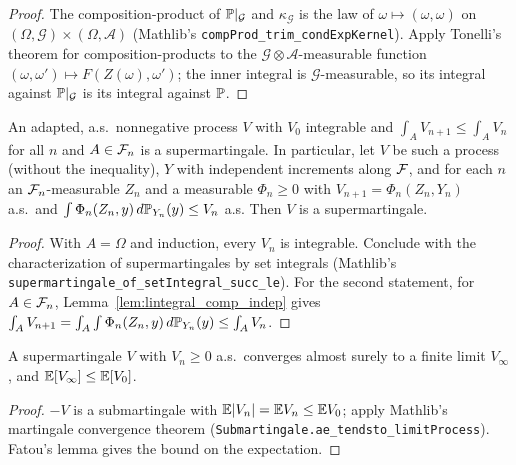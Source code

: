 \begin{proof}
  \leanok
  The composition-product of $\mathbb{P}|_{\mathcal G}$ and $\kappa_{\mathcal G}$ is the law of
  $\omega \mapsto (\omega, \omega)$ on $(\Omega, \mathcal G) \times (\Omega, \mathcal A)$ (Mathlib's
  \texttt{compProd\_trim\_condExpKernel}). Apply Tonelli's theorem for composition-products to
  the $\mathcal G \otimes \mathcal A$-measurable function $(\omega, \omega') \mapsto F(Z(\omega),
  \omega')$; the inner integral is $\mathcal G$-measurable, so its integral against
  $\mathbb{P}|_{\mathcal G}$ is its integral against $\mathbb{P}$.
\end{proof}

\begin{lemma}
  \label{lem:supermartingale_of_markov}
  \leanok
  An adapted, a.s.\ nonnegative process $V$ with $V_0$ integrable and $\int_A V_{n+1} \le \int_A
  V_n$ for all $n$ and $A \in \mathcal{F}_n$ is a supermartingale. In particular, let $V$ be such a process
  (without the inequality), $Y$ with independent increments along $\mathcal{F}$, and for each $n$ an
  $\mathcal{F}_n$-measurable $Z_n$ and a measurable $\Phi_n \ge 0$ with $V_{n+1} = \Phi_n(Z_n, Y_n)$ a.s.\
  and $\int \Phi_n(Z_n, y) \, d\mathbb{P}_{Y_n}(y) \le V_n$ a.s. Then $V$ is a supermartingale.
\end{lemma}

\begin{proof}
  \leanok
  With $A = \Omega$ and induction, every $V_n$ is integrable. Conclude with the characterization of
  supermartingales by set integrals (Mathlib's \texttt{supermartingale\_of\_setIntegral\_succ\_le}).
  For the second statement, for $A \in \mathcal{F}_n$, Lemma~\ref{lem:lintegral_comp_indep} gives
  $\int_A V_{n+1} = \int_A \int \Phi_n(Z_n, y)\,d\mathbb{P}_{Y_n}(y) \le \int_A V_n$.
\end{proof}

\begin{lemma}
  \label{lem:supermartingale_tendsto}
  \leanok
  A supermartingale $V$ with $V_n \ge 0$ a.s.\ converges almost surely to a finite limit
  $V_\infty$, and $\mathbb{E}[V_\infty] \le \mathbb{E}[V_0]$.
\end{lemma}

\begin{proof}
  \leanok
  $-V$ is a submartingale with $\mathbb{E}\lvert V_n \rvert = \mathbb{E} V_n \le \mathbb{E} V_0$; apply Mathlib's martingale
  convergence theorem (\texttt{Submartingale.ae\_tendsto\_limitProcess}). Fatou's lemma gives the
  bound on the expectation.
\end{proof}

